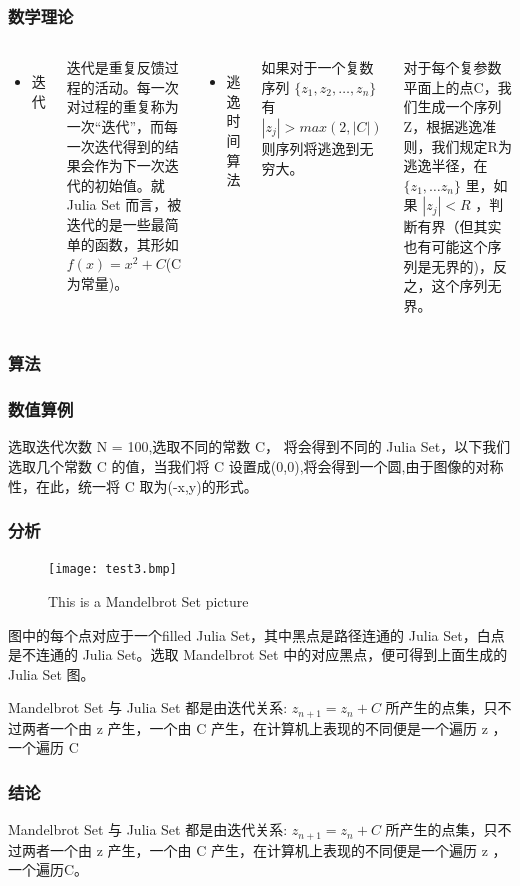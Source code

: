 \documentclass{beamer}
\begin{document}
\begin{frame}
  \frametitle{数学理论}
  \begin{columns}
    \begin{itemize}
    \item 迭代
    \end{itemize}
    迭代是重复反馈过程的活动。每一次对过程的重复称为一次“迭代”，而每一次迭代得到的结果会作为下一次迭代的初始值。就 Julia Set 而言，被迭代的是一些最简单的函数，其形如 $f(x) = x^2 + C$(C 为常量)。
    \begin{itemize}
    \item 逃逸时间算法
    \end{itemize}
    如果对于一个复数序列 $\{z_1, z_2, \dots, z_n\}$ 有 $|z_j| > max(2,|C|)$ 则序列将逃逸到无穷大。

    对于每个复参数平面上的点C，我们生成一个序列Z，根据逃逸准则，我们规定R为逃逸半径，在 $\{z_1, \dots z_n\}$ 里，如果 $|z_j| < R$ ，判断有界（但其实也有可能这个序列是无界的)，反之，这个序列无界。
  \end{columns}
\end{frame}

\begin{frame}
  \frametitle{算法}
\end{frame}

\begin{frame}
  \frametitle{数值算例}
  选取迭代次数 N = 100,选取不同的常数 C， 将会得到不同的 Julia Set，以下我们选取几个常数 C 的值，当我们将 C 设置成(0,0),将会得到一个圆,由于图像的对称性，在此，统一将 C 取为(-x,y)的形式。
  \begin{figure}[H]
    \centering
  \end{figure}
  \begin{figure}[H]
    \centering
  \end{figure}
\end{frame}

\begin{frame}
  \frametitle{分析}
  \begin{figure}[H]
  \texttt{[image: test3.bmp]}
  \caption{This is a Mandelbrot Set picture}
  \end{figure}
  图中的每个点对应于一个filled Julia Set，其中黑点是路径连通的 Julia Set，白点是不连通的 Julia Set。选取 Mandelbrot Set 中的对应黑点，便可得到上面生成的 Julia Set 图。

  Mandelbrot Set 与 Julia Set 都是由迭代关系: $z_{n+1} = z_n + C$ 所产生的点集，只不过两者一个由 z 产生，一个由 C 产生，在计算机上表现的不同便是一个遍历 z ，一个遍历 C 
\end{frame}

\begin{frame}
  \frametitle{结论}
  Mandelbrot Set 与 Julia Set 都是由迭代关系: $z_{n+1} = z_n + C$ 所产生的点集，只不过两者一个由 z 产生，一个由 C 产生，在计算机上表现的不同便是一个遍历 z ，一个遍历C。
\end{frame}
\end{document}
